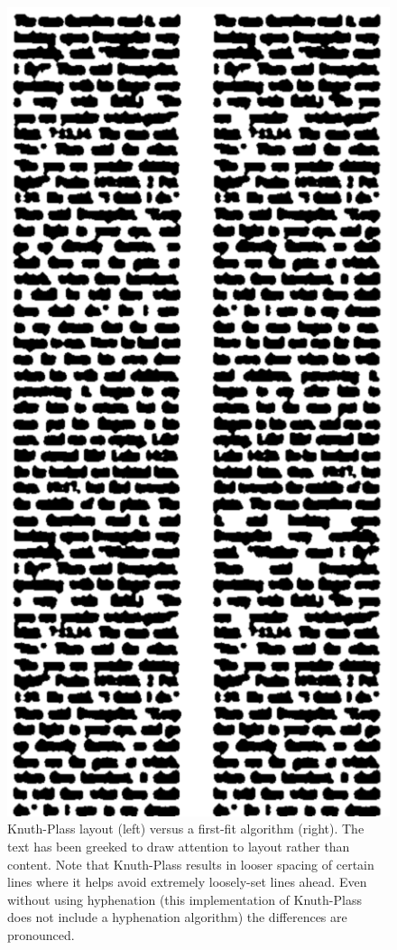 \begin{figure}
\begin{center}
\includegraphics[height=0.8\textheight]{gfx/greek}
\end{center}
\caption[Knuth-Plass layout versus a first-fit algorithm]{Knuth-Plass layout (left) versus a first-fit algorithm (right). The text has been greeked to draw attention to layout rather than content. Note that Knuth-Plass results in looser spacing of certain lines where it helps avoid extremely loosely-set lines ahead. Even without using hyphenation (this implementation of Knuth-Plass does not include a hyphenation algorithm) the differences are pronounced. }
\label{fig:greek}
\end{figure}

